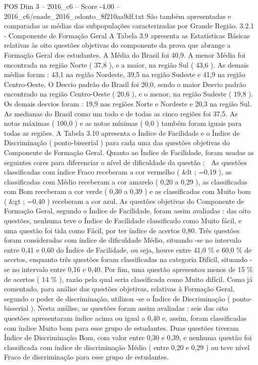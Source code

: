 \begin{textsample}{POS Dim 3 – 2016\_c6 – Score -4.00 – 2016\_c6/enade\_2016\_odonto\_8f210aa9df.txt}
São também apresentadas e comparadas as médias das subpopulações caracterizadas por Grande Região. 3.2.1 - Componente de Formação Geral A Tabela 3.9 apresenta as Estatísticas Básicas relativas às oito questões objetivas do componente da prova que abrange a Formação Geral dos estudantes.
A Média do Brasil foi 40,9.
A menor Média foi encontrada na região Norte ( 37,8 ), e a maior, na região Sul ( 43,6 ).
As demais médias foram : 43,1 na região Nordeste, 39,5 na região Sudeste e 41,9 na região Centro-Oeste.
O Desvio padrão do Brasil foi 20,0, sendo o maior Desvio padrão encontrado na região Centro-Oeste ( 20,6 ), e o menor, na região Sudeste ( 19,8 ).
Os demais desvios foram : 19,9 nas regiões Norte e Nordeste e 20,3 na região Sul.
As medianas do Brasil como um todo e de todas as cinco regiões foi 37,5.
As notas máximas ( 100,0 ) e as notas mínimas ( 0,0 ) também foram iguais para todas as regiões.
A Tabela 3.10 apresenta o Índice de Facilidade e o Índice de Discriminação ( ponto-bisserial ) para cada uma das questões objetivas do Componente de Formação Geral.
Quanto ao Índice de Facilidade, foram usadas as seguintes cores para diferenciar o nível de dificuldade da questão :  As questões classificadas com índice Fraco receberam a cor vermelho ( \&lt ; =0,19 ), as classificadas com Médio receberam a cor amarelo ( 0,20 a 0,29 ), as classificadas com Bom receberam a cor verde ( 0,30 a 0,39 ) e as classificadas com Muito bom ( \&gt ; =0,40 ) receberam a cor azul.
As questões objetivas do Componente de Formação Geral, segundo o Índice de Facilidade, foram assim avaliadas : das oito questões, nenhuma teve o Índice de Facilidade classificado como Muito fácil, e uma questão foi tida como Fácil, por ter índice de acertos 0,80.
Três questões foram consideradas com índice de dificuldade Médio, situando -se no intervalo entre 0,41 e 0,60 do Índice de Facilidade, ou seja, houve entre 41,0 \% e 60,0 \% de acertos, enquanto três questões foram classificadas na categoria Difícil, situando -se no intervalo entre 0,16 e 0,40.
Por fim, uma questão apresentou menos de 15 \% de acertos ( 14 \% ), razão pela qual seria classificada como Muito difícil.
Como já comentado, para análise das questões objetivas, relativas à Formação Geral, segundo o poder de discriminação, utilizou -se o Índice de Discriminação ( ponto-bisserial ).
Nesta análise, as questões foram assim avaliadas : seis das oito questões apresentaram índice acima ou igual a 0,40 e, assim, foram classificadas com índice Muito bom para esse grupo de estudantes.
Duas questões tiveram Índice de Discriminação Bom, com valor entre 0,30 e 0,39, e nenhuma questão foi classificada com índice de discriminação Médio ( entre 0,20 e 0,29 ) ou teve nível Fraco de discriminação para esse grupo de estudantes.

\end{textsample}
